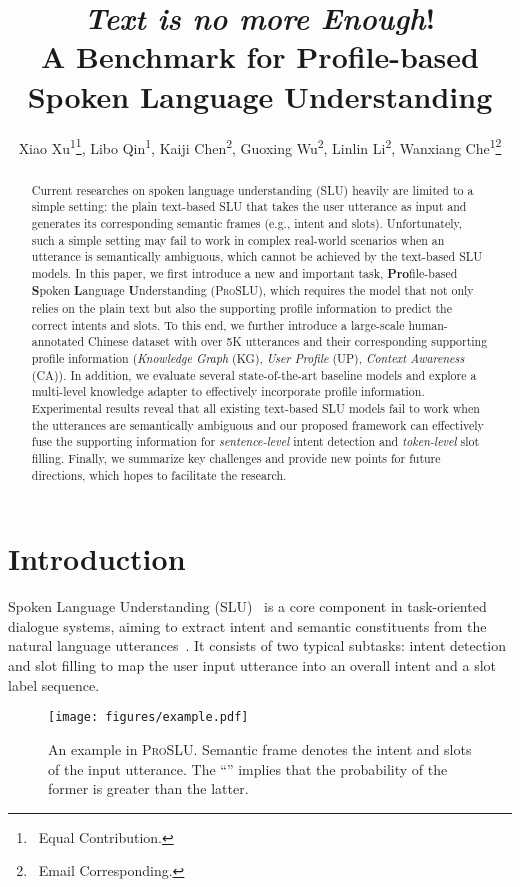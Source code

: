 \documentclass[letterpaper]{article} \usepackage{aaai22}  \usepackage{times}  \usepackage{helvet}  \usepackage{courier}  \usepackage[hyphens]{url}  \usepackage{graphicx} \urlstyle{rm} \def\UrlFont{\rm}  \usepackage{natbib}  \usepackage{caption} \DeclareCaptionStyle{ruled}{labelfont=normalfont,labelsep=colon,strut=off} \frenchspacing  \setlength{\pdfpagewidth}{8.5in}  \setlength{\pdfpageheight}{11in}  \usepackage{algorithm}
\title{
  \textit{Text is no more Enough}!
  \\ A Benchmark for Profile-based Spoken Language Understanding
}
\author{
    Xiao Xu\textsuperscript{\rm 1}\thanks{\ Equal Contribution.},
    Libo Qin\textsuperscript{\rm 1}\footnotemark[1], 
    Kaiji Chen\textsuperscript{\rm 2}, 
    Guoxing Wu\textsuperscript{\rm 2}, 
    Linlin Li\textsuperscript{\rm 2}, 
    Wanxiang Che\textsuperscript{\rm 1}\thanks{\ Email Corresponding.}
}
\begin{document}
\maketitle
\begin{abstract} \label{Abstract}
	Current researches on spoken language understanding (SLU) heavily are limited to a simple setting: the plain text-based SLU that takes the user utterance as input and generates its corresponding semantic frames (e.g., intent and slots). 
	Unfortunately, such a simple setting may fail to work in complex real-world scenarios when an utterance is semantically ambiguous, which cannot be achieved by the text-based SLU models.
    In this paper, we first introduce a new and important task, \textbf{Pro}file-based \textbf{S}poken \textbf{L}anguage \textbf{U}nderstanding (\textsc{ProSLU}), which requires the model that not only relies on the plain text but also the supporting profile information to predict the correct intents and slots.
    To this end, we further introduce a large-scale human-annotated Chinese dataset with over 5K utterances and their corresponding supporting profile information (\textit{Knowledge Graph} (KG), \textit{User Profile} (UP), \textit{Context Awareness} (CA)).
    In addition,  we evaluate several state-of-the-art baseline models and explore a multi-level knowledge adapter to effectively incorporate profile information. 
    Experimental results reveal that all existing text-based SLU models fail to work when the utterances are semantically ambiguous and our proposed framework can effectively fuse the supporting information for \textit{sentence-level} intent detection and \textit{token-level} slot filling.
    Finally, we summarize key challenges and provide new points for future directions, which hopes to facilitate the research.
\end{abstract} \section{Introduction}
\label{Introduction}
Spoken Language Understanding (SLU)~\citep{young2013pomdp,ijcai2021-622} is a core component in task-oriented dialogue systems, aiming to extract intent and semantic constituents from the natural language utterances~\citep{tur2011spoken}.
It consists of two typical subtasks: intent detection and slot filling to map the user input utterance into an overall intent and a slot label sequence.

\begin{figure}[t]
	\centering
	\texttt{[image: figures/example.pdf]}
	\caption{An example in \textsc{ProSLU}. Semantic frame denotes the intent and slots of the input utterance. The ``''  implies that the probability of the former is greater than the latter.
	}
	\label{fig:example-simple}
\end{figure}
\end{document}
